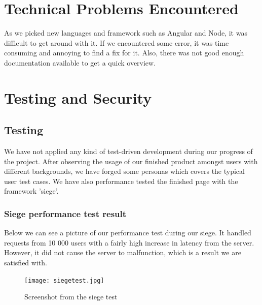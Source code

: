 \documentclass[a4paper]{article}
\begin{document}
\section{Technical Problems Encountered } As we picked new languages and framework such as Angular and Node, it was difficult to get around with it. If we encountered some error, it was time consuming and annoying to find a fix for it. Also, there was not good enough documentation available to get a quick overview. 

\section{Testing and Security}
\subsection{Testing} We have not applied any kind of test-driven development during our progress of the project. After observing the usage of our finished product amongst users with different backgrounds, we have forged some personas which covers the typical user test cases. We have also performance tested the finished page with the framework 'siege'.
\subsubsection{Siege performance test result}
Below we can see a picture of our performance test during our siege.
It handled requests from 10 000 users with a fairly high increase in latency from the server. However, it did not cause the server to malfunction, which is a result we are satisfied with.
\begin{figure}[H] 
  \centering
  \texttt{[image: siegetest.jpg]}\hfill
  \caption{Screenshot from the siege test}\label{siegetest}
\end{figure}
\end{document}
